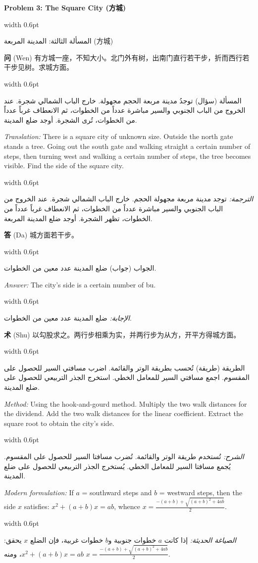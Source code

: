 \documentclass[11pt,a4paper]{article}
\newlength{\cnwidth}
\newlength{\arwidth}
\newcommand{\paralleltext}[2]{%
  \par\medskip\noindent
  \begin{minipage}[t]{\cnwidth}%
    \small #1%
  \end{minipage}%
  \hfill\textcolor{colrule}{\vrule width 0.6pt}\hfill
  \begin{minipage}[t]{\arwidth}%
    \small\arabicfont\beginR #2\endR%
  \end{minipage}%
  \par\medskip
}
\newcommand{\parallelsubsection}[2]{%
  \par\medskip\noindent
  \begin{minipage}[t]{\cnwidth}%
    \large\bfseries\color{sectioncolor} #1%
  \end{minipage}%
  \hfill\textcolor{colrule}{\vrule width 0.6pt}\hfill
  \begin{minipage}[t]{\arwidth}%
    \large\arabicfontbf\color{sectioncolor}\beginR #2\endR%
  \end{minipage}%
  \par\smallskip
}
\newcommand{\cnlabel}[1]{\textbf{\color{notecolor}#1}}
\newcommand{\arlabel}[1]{\arabicfontbf\color{notecolor}\beginR #1\endR}
\begin{document}
\parallelsubsection{Problem 3: The Square City (方城)}{المسألة الثالثة: المدينة المربعة (方城)}

\paralleltext{%
\cnlabel{问} (Wen) 有方城一座，不知大小。北门外有树，出南门直行若干步，折而西行若干步见树。求城方面。
}{%
\arlabel{المسألة} (سؤال) توجدُ مدينة مربعة الحجم مجهولة. خارج الباب الشمالي شجرة. عند الخروج من الباب الجنوبي والسير مباشرة عدداً من الخطوات، ثم الانعطاف غرباً عدداً من الخطوات، تُرى الشجرة. أوجد ضلع المدينة.
}

\paralleltext{%
\textit{Translation:} There is a square city of unknown size. Outside the north gate stands a tree. Going out the south gate and walking straight a certain number of steps, then turning west and walking a certain number of steps, the tree becomes visible. Find the side of the square city.
}{%
\textit{الترجمة:} توجد مدينة مربعة مجهولة الحجم. خارج الباب الشمالي شجرة. عند الخروج من الباب الجنوبي والسير مباشرة عدداً من الخطوات، ثم الانعطاف غرباً عدداً من الخطوات، تظهر الشجرة. أوجد ضلع المدينة المربعة.
}

\paralleltext{%
\cnlabel{答} (Da) 城方面若干步。
}{%
\arlabel{الجواب} (جواب) ضلع المدينة عدد معين من الخطوات.
}

\paralleltext{%
\textit{Answer:} The city's side is a certain number of bu.
}{%
\textit{الإجابة:} ضلع المدينة عدد معين من الخطوات.
}

\paralleltext{%
\cnlabel{术} (Shu) 以勾股求之。两行步相乘为实，并两行步为从方，开平方得城方面。
}{%
\arlabel{الطريقة} (طريقة) تُحسب بطريقة الوتر والقائمة. اضرب مسافتي السير للحصول على المقسوم. اجمع مسافتي السير للمعامل الخطي. استخرج الجذر التربيعي للحصول على ضلع المدينة.
}

\paralleltext{%
\textit{Method:} Using the hook-and-gourd method. Multiply the two walk distances for the dividend. Add the two walk distances for the linear coefficient. Extract the square root to obtain the city's side.
}{%
\textit{الشرح:} تُستخدم طريقة الوتر والقائمة. تُضرب مسافتا السير للحصول على المقسوم. يُجمع مسافتا السير للمعامل الخطي. يُستخرج الجذر التربيعي للحصول على ضلع المدينة.
}

\paralleltext{%
\textit{Modern formulation:} If $a$ = southward steps and $b$ = westward steps, then the side $x$ satisfies: $x^2 + (a+b)x = ab$, whence $x = \frac{-(a+b) + \sqrt{(a+b)^2 + 4ab}}{2}$.
}{%
\textit{الصياغة الحديثة:} إذا كانت $a$ خطوات جنوبية و$b$ خطوات غربية، فإن الضلع $x$ يحقق: $x^2 + (a+b)x = ab$، ومنه $x = \frac{-(a+b) + \sqrt{(a+b)^2 + 4ab}}{2}$.
}
\end{document}

